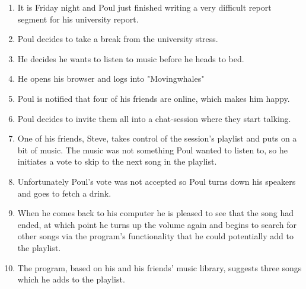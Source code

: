 \begin{enumerate}
	\item It is Friday night and Poul just finished writing a very difficult report segment for his university report.
	\item Poul decides to take a break from the university stress.
	\item He decides he wants to listen to music before he heads to bed.
	\item He opens his browser and logs into "Movingwhales" 
	\item Poul is notified that four of his friends are online, which makes him happy.
	\item Poul decides to invite them all into a chat-session where they start talking.
	\item One of his friends, Steve, takes control of the session's playlist and puts on a bit of music. The music was not something Poul wanted to listen to, so he initiates a vote to skip to the next song in the playlist.
	\item Unfortunately Poul's vote was not accepted so Poul turns down his speakers and goes to fetch a drink.
	\item When he comes back to his computer he is pleased to see that the song had ended, at which point he turns up the volume again and begins to search for other songs via the program's functionality that he could potentially add to the playlist.
	\item The program, based on his and his friends' music library, suggests three songs which he adds to the playlist.

\end{enumerate}